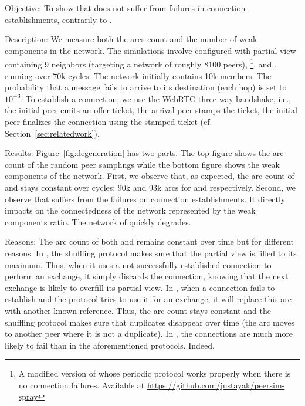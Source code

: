 \begin{asparadesc}
\item[Objective:] To show that \SPRAY does not suffer from failures in
  connection establishments, contrarily to \SCAMP.
\item[Description:] We measure both the arcs count and the number of weak
  components in the network. The simulations involve \CYCLON configured with
  partial view containing 9 neighbors (targeting a network of roughly 8100
  peers), \SCAMP\footnote{A modified version of \SCAMP whose periodic protocol
    works properly when there is no connection failures. Available at
    \url{https://github.com/justayak/peersim-spray}}, and \SPRAY, running over
  70k cycles. The network initially contains 10k members. The probability that
  a message fails to arrive to its destination (each hop) is set to $10^{-3}$. To
  establish a connection, we use the WebRTC three-way handshake, i.e., the
  initial peer emits an offer ticket, the arrival peer stamps the ticket, the
  initial peer finalizes the connection using the stamped ticket
  (cf. Section~\ref{sec:relatedwork}).
\item[Results:] Figure~\ref{fig:degeneration} has two parts. The
  top figure shows the arc count of the random peer samplings while the bottom
  figure shows the weak components of the network.  First, we observe that, as
  expected, the arc count of \CYCLON and \SPRAY stays constant over cycles: 90k
  and 93k arcs for \CYCLON and \SPRAY respectively. Second, we observe that
  \SCAMP suffers from the failures on connection establishments. It directly
  impacts on the connectedness of the network represented by the weak
  components ratio. The network of \SCAMP quickly degrades.
\item[Reasons:] The arc count of both \CYCLON and \SPRAY remains constant over
  time but for different reasons. In \CYCLON, the shuffling protocol makes sure
  that the partial view is filled to its maximum. Thus, when it uses a not
  successfully established connection to perform an exchange, it simply
  discards the connection, knowing that the next exchange is likely to overfill
  its partial view. In \SPRAY, when a connection fails to establish and the
  protocol tries to use it for an exchange, it will replace this arc with
  another known reference. Thus, the arc count stays constant and the shuffling
  protocol makes sure that duplicates disappear over time (the arc moves to
  another peer where it is not a duplicate). In \SCAMP, the connections are
  much more likely to fail than in the aforementioned protocols. Indeed,

\end{asparadesc}
